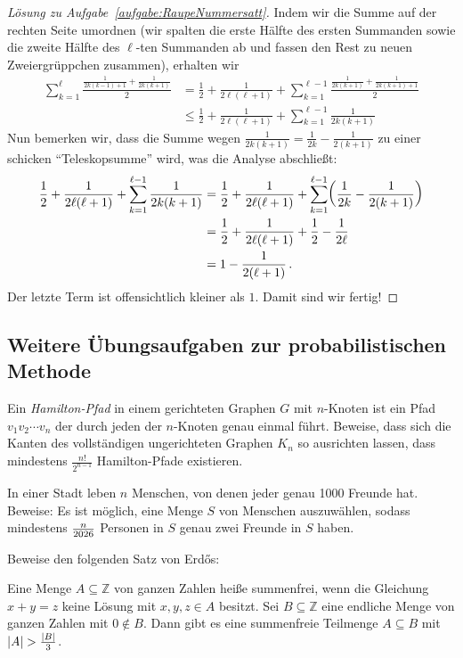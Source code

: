 \begin{proof}[Lösung zu Aufgabe~\ref{aufgabe:RaupeNummersatt}]
	Indem wir die Summe auf der rechten Seite umordnen (wir spalten die erste Hälfte des ersten Summanden sowie die zweite Hälfte des $\ell$-ten Summanden ab und fassen den Rest zu neuen Zweiergrüppchen zusammen), erhalten wir 
	\begin{align*}
		\sum_{k=1}^\ell\frac{\frac{1}{2k(k-1)+1}+\frac{1}{2k(k+1)}}{2}&=\frac12+\frac1{2\ell(\ell+1)}+\sum_{k=1}^{\ell-1}\frac{\frac{1}{2k(k+1)}+\frac{1}{2k(k+1)+1}}{2}\\
		&\leqslant \frac{1}{2}+\frac{1}{2\ell(\ell+1)}+\sum_{k=1}^{\ell-1}\frac{1}{2k(k+1)}
	\end{align*}
	Nun bemerken wir, dass die Summe wegen $\frac{1}{2k(k+1)}=\frac{1}{2k}-\frac{1}{2(k+1)}$ zu einer schicken \enquote{Teleskopsumme} wird, was die Analyse abschließt:
	\begin{align*}
		\frac{1}{2}+\frac{1}{2\ell(\ell+1)}+\sum_{k=1}^{\ell-1}\frac{1}{2k(k+1)}&=\frac{1}{2}+\frac{1}{2\ell(\ell+1)}+\sum_{k=1}^{\ell-1}\parens*{\frac1{2k}-\frac1{2(k+1)}}\\
		&=\frac{1}{2}+\frac{1}{2\ell(\ell+1)}+\frac1{2}-\frac1{2\ell}\\
		&=1-\frac{1}{2(\ell+1)}\,.
	\end{align*}
	Der letzte Term ist offensichtlich kleiner als $1$. Damit sind wir fertig!
\end{proof}

\subsection*{Weitere Übungsaufgaben zur probabilistischen Methode}
\begin{aufgabe*}
	Ein \emph{Hamilton-Pfad} in einem gerichteten Graphen $G$ mit $n$-Knoten ist ein Pfad $v_1v_2\dotsb v_n$ der durch jeden der $n$-Knoten genau einmal führt. Beweise, dass sich die Kanten des vollständigen ungerichteten Graphen $K_n$ so ausrichten lassen, dass mindestens $\frac{n!}{2^{n-1}}$ Hamilton-Pfade existieren.
\end{aufgabe*}
\begin{aufgabe*}
	In einer Stadt leben $n$ Menschen, von denen jeder genau 1000 Freunde hat. Beweise: Es ist möglich, eine Menge $S$ von Menschen auszuwählen, sodass mindestens $\frac{n}{\the\year}$ Personen in $S$ genau zwei Freunde in $S$ haben.
\end{aufgabe*}
\begin{aufgabe*}[***]
	Beweise den folgenden Satz von Erd\H{o}s:
	\begin{satzmitnamen}[Satz]
		Eine Menge $A\subseteq\mathbb Z$ von ganzen Zahlen heiße summenfrei, wenn die Gleichung $x+y=z$ keine Lösung mit $x,y,z\in A$ besitzt. Sei $B\subseteq \mathbb Z$ eine endliche Menge von ganzen Zahlen mit $0\notin B$. Dann gibt es eine summenfreie Teilmenge $A\subseteq B$ mit $\lvert A\rvert>\frac{\lvert B\rvert}{3}$.
	\end{satzmitnamen}
\end{aufgabe*}